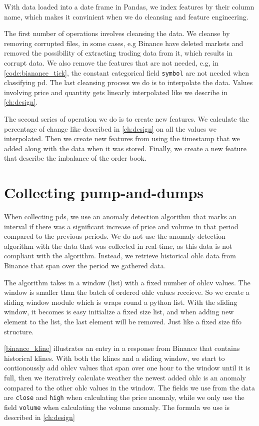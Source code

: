 With data loaded into a date frame in Pandas, we index features by their column name, which makes it convinient when we do cleansing and feature engineering. 

The first number of operations involves cleansing the data. We cleanse by removing corrupted files, in some cases, e.g Binance have deleted markets and removed the possibility of extracting trading data from it, which results in corrupt data. We also remove the features that are not needed, e.g, in \autoref{code:bianance_tick}, the constant categorical field \texttt{symbol} are not needed when classifying \ac{pd}. The last cleansing process we do is to interpolate the data. Values involving price and quantity gets linearly interpolated like we describe in \autoref{ch:design}.

The second series of operation we do is to create new features. We calculate the percentage of change like described in \autoref{ch:design} on all the values we interpolated. Then we create new features from using the timestamp that we added along with the data when it was stored. Finally, we create a new feature that describe the imbalance of the order book.

\section{Collecting pump-and-dumps}
When collecting \acp{pd}, we use an anomaly detection algorithm that marks an interval if there was a significant increase of price and volume in that period compared to the previous periods. We do not use the anomaly detection algorithm with the data that was collected in real-time, as this data is not compliant with the algorithm. Instead, we retrieve historical \ac{ohlc} data from Binance that span over the period we gathered data.

The algorithm takes in a window (list) with a fixed number of \ac{ohlcv} values. The window is smaller than the batch of ordered \ac{ohlc} values receieve. So we create a sliding window module which is wraps round a python list. With the sliding window, it becomes is easy initialize a fixed size list, and when adding new element to the list, the last element will be removed. Just like a fixed size \ac{fifo} structure.

\autoref{binance_kline} illustrates an entry in a response from Binance that contains historical klines. With both the klines and a sliding window, we start to contionoussly add \ac{ohlcv} values that span over one hour to the window until it is full, then we iteratively calculate weather the newest added \ac{ohlc} is an anomaly compared to the other \ac{ohlc} values in the window. The fields we use from the data are \texttt{close} and \texttt{high} when calculating the price anomaly, while we only use the field \texttt{volume} when calculating the volume anomaly. The formula we use is described in \autoref{ch:design}

